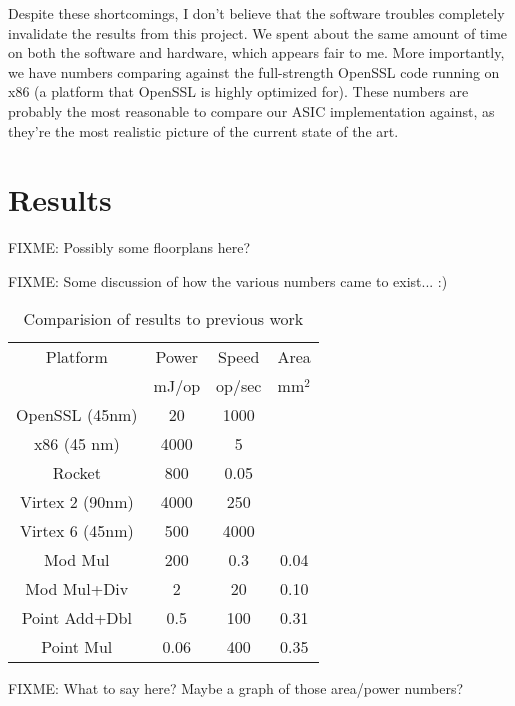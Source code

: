\documentclass[twocolumn]{article}
\begin{document}
Despite these shortcomings, I don't believe that the software troubles
completely invalidate the results from this project.  We spent about
the same amount of time on both the software and hardware, which
appears fair to me.  More importantly, we have numbers comparing
against the full-strength OpenSSL code running on x86 (a platform that
OpenSSL is highly optimized for\cite{kasper-openssl_ecc}).  These
numbers are probably the most reasonable to compare our ASIC
implementation against, as they're the most realistic picture of the
current state of the art.

\section{Results}

FIXME: Possibly some floorplans here?

FIXME: Some discussion of how the various numbers came to exist... :)

\begin{table}[ht]
  \begin{center}
    \begin{tabular}{c|ccc}
      Platform        & Power & Speed  & Area \\
                      & mJ/op & op/sec & mm$^2$ \\
      \hline
      OpenSSL (45nm)  & 20    & 1000   &      \\
      x86 (45 nm)     & 4000  & 5      &      \\
      Rocket          & 800   & 0.05   &      \\
      Virtex 2 (90nm) & 4000  & 250    &      \\
      Virtex 6 (45nm) & 500   & 4000   &      \\
      \hline
      Mod Mul         & 200   & 0.3    & 0.04 \\
      Mod Mul+Div     & 2     & 20     & 0.10 \\
      Point Add+Dbl   & 0.5   & 100    & 0.31 \\
      Point Mul       & 0.06  & 400    & 0.35 \\
    \end{tabular}
  \end{center}

  \caption{Comparision of results to previous work
    \label{results}}
\end{table}

FIXME: What to say here?  Maybe a graph of those area/power numbers?
\end{document}
